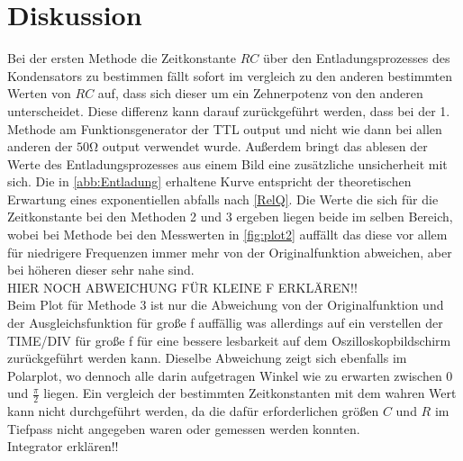 \section{Diskussion}
\label{sec:Diskussion}
Bei der ersten Methode die Zeitkonstante $RC$ über den Entladungsprozesses des Kondensators zu bestimmen fällt sofort im vergleich zu
den anderen bestimmten Werten von $RC$ auf, dass sich dieser um ein Zehnerpotenz von den anderen unterscheidet. Diese differenz kann darauf
zurückgeführt werden, dass bei der 1. Methode am Funktionsgenerator der TTL output und nicht wie dann bei allen anderen der $50\unit{\ohm}$
output verwendet wurde. Außerdem bringt das ablesen der Werte des Entladungsprozesses aus einem Bild eine zusätzliche unsicherheit mit sich.
Die in \autoref{abb:Entladung} erhaltene Kurve entspricht der theoretischen Erwartung eines exponentiellen abfalls nach \eqref{RelQ}.
Die Werte die sich für die Zeitkonstante bei den Methoden 2 und 3 ergeben liegen beide im selben Bereich, wobei bei Methode bei den Messwerten
in \autoref{fig:plot2} auffällt das diese vor allem für niedrigere Frequenzen immer mehr von der Originalfunktion abweichen, aber bei höheren dieser sehr nahe sind.\\
HIER NOCH ABWEICHUNG FÜR KLEINE F ERKLÄREN!!\\
Beim Plot für Methode 3 ist nur die Abweichung von der Originalfunktion und der Ausgleichsfunktion für große f auffällig was allerdings auf ein verstellen der TIME/DIV
für große f für eine bessere lesbarkeit auf dem Oszilloskopbildschirm zurückgeführt werden kann. Dieselbe Abweichung zeigt sich ebenfalls im Polarplot, wo dennoch alle
darin aufgetragen Winkel wie zu erwarten zwischen $0$ und $\frac{\pi}{2}$ liegen.
Ein vergleich der bestimmten Zeitkonstanten mit dem wahren Wert kann nicht durchgeführt werden, da die dafür erforderlichen größen $C$ und $R$ im Tiefpass nicht angegeben waren
oder gemessen werden konnten.\\
Integrator erklären!!